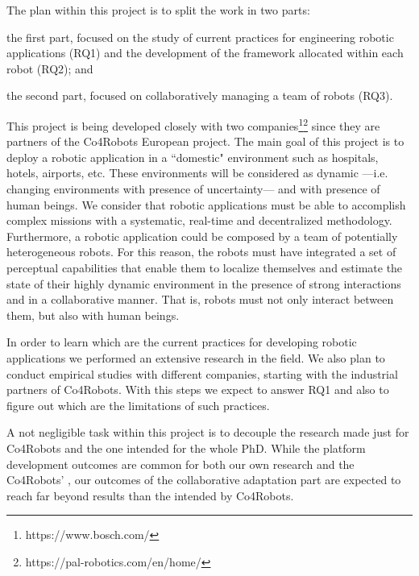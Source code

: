 The plan within this project is to split the work in two parts:
\begin{enumerate*}
\item the first part, focused on the study of current practices for engineering robotic applications (RQ1) and the development of the framework allocated within each robot (RQ2); and
\item the second part, focused on collaboratively managing a team of robots (RQ3).
\end{enumerate*}

This project is being developed closely with two companies\footnote{https://www.bosch.com/}\footnote{https://pal-robotics.com/en/home/} since they are partners of the Co4Robots European project.
The main goal of this project is to deploy a robotic application in a ``domestic" environment such as hospitals, hotels, airports, etc.
These environments will be considered as dynamic ---i.e. changing environments with presence of uncertainty--- and with presence of human beings.
We consider that robotic applications must be able to accomplish complex missions with a systematic, real-time and decentralized methodology.
Furthermore, a robotic application could be composed by a team of potentially heterogeneous robots.
For this reason, the robots must have integrated a set of perceptual capabilities that enable them to localize themselves and estimate the state of their highly dynamic environment in the presence of strong interactions and in a collaborative manner.
That is, robots must not only interact between them, but also with human beings.

In order to learn which are the current practices for developing robotic applications we performed an extensive research in the field.
We also plan to conduct empirical studies with different companies, starting with the industrial partners of Co4Robots.
With this steps we expect to answer RQ1 and also to figure out which are the limitations of such practices.  

A not negligible task within this project is to decouple the research made just for Co4Robots and the one intended for the whole PhD.
While the platform development outcomes are common for both our own research and the Co4Robots' , our outcomes of the collaborative adaptation part are expected to reach far beyond results than the intended by Co4Robots.



